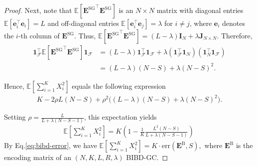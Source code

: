 \documentclass[lettersize,journal]{IEEEtran}
\newcommand{\err}[1]{\mathrm{err}(#1, S)}
\newcommand{\ones}[1]{\boldsymbol{1}_{#1}}
\newcommand{\F}{\mathcal{F}}
\newcommand{\ident}[1]{\boldsymbol{I}_{#1}}
\newcommand{\allones}[1]{\boldsymbol{J}_{#1}}
\newcommand{\GSG}{\boldsymbol{E}^{\mathrm{SG}}}
\newcommand{\GB}{\boldsymbol{E}^{\mathrm{B}}}
\newcommand{\ex}[1]{\mathbb{E}\left[#1\right]}
\begin{document}
{\begin{proof}
Next, note that $\ex{{\GSG}^\top\GSG}$ is an $N\times N$ matrix with diagonal entries $\ex{\boldsymbol{e}_i^\top\boldsymbol{e}_i}=L$ and off-diagonal entries $\ex{\boldsymbol{e}_i^\top\boldsymbol{e}_j}=\lambda$ for $i\neq j$, where $\boldsymbol{e}_i$ denotes the $i$-th column of $\GSG$. 
Thus, $\ex{{\GSG}^\top\GSG} = (L-\lambda)\ident{N} + \lambda\allones{N\times N}.$
Therefore,
\begin{align*}
\ones{\F}^\top\ex{{\GSG}^\top\GSG}\ones{\F}&= (L-\lambda)\ones{\F}^\top\ones{\F}
    + \lambda(\ones{\F}^\top\ones{N})(\ones{N}^\top\ones{\F})\\
&= (L-\lambda)(N-S) + \lambda(N-S)^2.
\end{align*}

Hence, $\ex{\textstyle\sum_{i=1}^{K}X_i^2}$ equals the following expression
\begin{align*}
K - 2\rho L (N-S)+ \rho^2\big((L-\lambda)(N-S) + \lambda(N-S)^2\big).
\end{align*}

Setting $\rho = \frac{L}{L+\lambda(N-S-1)}$, this expectation yields
\begin{align*}
&\ex{\textstyle\sum_{i=1}^{K}X_i^2}
= K\left(1 - \tfrac{1}{K}\tfrac{L^2(N-S)}{L + \lambda (N-S-1)}\right) \quad
\end{align*}
By Eq.\eqref{eq:bibd-error}, we have $\mathbb{E}[\textstyle\sum_{i=1}^{K}X_i^2] = K\cdot\err{\GB},$
where $\GB$ is the encoding matrix of an $(N, K, L, R, \lambda)$ BIBD-GC.
\end{proof}




}
\end{document}
